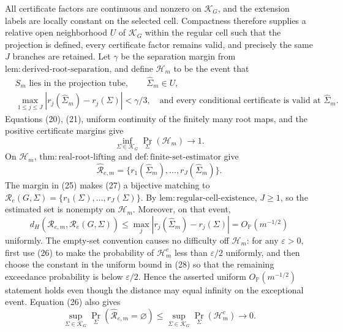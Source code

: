 All certificate factors are continuous and nonzero on \(\mathcal K_G\), and the extension labels are locally constant on the selected cell.  Compactness therefore supplies a relative open neighborhood \(U\) of \(\mathcal K_G\) within the regular cell such that the projection is defined, every certificate factor remains valid, and precisely the same \(J\) branches are retained.  Let \(\gamma\) be the separation margin from \(\mathrm{lem:derived\mbox{-}root\mbox{-}separation}\), and define \(\mathcal H_m\) to be the event that
\[
 \begin{split}
 &S_m\text{ lies in the projection tube},\qquad \widehat\Sigma_m\in U,\\
 &\max_{1\leq j\leq J}|r_j(\widehat\Sigma_m)-r_j(\Sigma)|<\gamma/3,
 \quad\text{and every conditional certificate is valid at }\widehat\Sigma_m.
 \end{split}
\tag{25}
\]
Equations (20), (21), uniform continuity of the finitely many root maps, and the positive certificate margins give
\[
 \inf_{\Sigma\in\mathcal K_G}\Pr_\Sigma(\mathcal H_m)\longrightarrow1.
\tag{26}
\]
On \(\mathcal H_m\), \(\mathrm{thm:real\mbox{-}root\mbox{-}lifting}\) and \(\mathrm{def:finite\mbox{-}set\mbox{-}estimator}\) give
\[
 \widehat{\mathcal R}_{e,m}
 =\{r_1(\widehat\Sigma_m),\ldots,r_J(\widehat\Sigma_m)\}.
\tag{27}
\]
The margin in (25) makes (27) a bijective matching to
\(\mathcal R_e(G,\Sigma)=\{r_1(\Sigma),\ldots,r_J(\Sigma)\}\).  By \(\mathrm{lem:regular\mbox{-}cell\mbox{-}existence}\), \(J\geq1\), so the estimated set is nonempty on \(\mathcal H_m\).  Moreover, on that event,
\[
 d_H\!\left(\widehat{\mathcal R}_{e,m},\mathcal R_e(G,\Sigma)\right)
 \leq\max_j|r_j(\widehat\Sigma_m)-r_j(\Sigma)|
 =O_{\mathbb P}(m^{-1/2})
\tag{28}
\]
uniformly.  The empty-set convention causes no difficulty off \(\mathcal H_m\): for any \(\varepsilon>0\), first use (26) to make the probability of \(\mathcal H_m^c\) less than \(\varepsilon/2\) uniformly, and then choose the constant in the uniform bound in (28) so that the remaining exceedance probability is below \(\varepsilon/2\).  Hence the asserted uniform \(O_{\mathbb P}(m^{-1/2})\) statement holds even though the distance may equal infinity on the exceptional event.  Equation (26) also gives
\[
 \sup_{\Sigma\in\mathcal K_G}
 \Pr_\Sigma(\widehat{\mathcal R}_{e,m}=\varnothing)
 \leq
 \sup_{\Sigma\in\mathcal K_G}\Pr_\Sigma(\mathcal H_m^c)
 \longrightarrow0.
\tag{29}
\]

